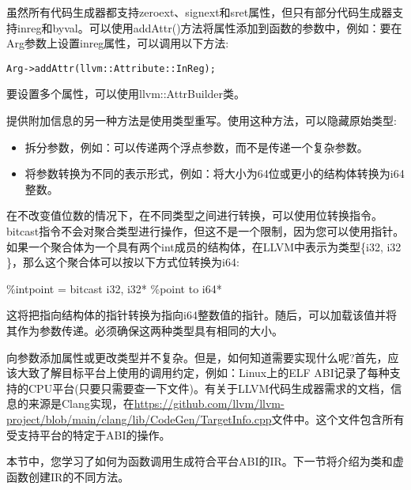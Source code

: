 虽然所有代码生成器都支持zeroext、signext和sret属性，但只有部分代码生成器支持inreg和byval。可以使用addAttr()方法将属性添加到函数的参数中，例如：要在Arg参数上设置inreg属性，可以调用以下方法:\par

\begin{lstlisting}[caption={}]
Arg->addAttr(llvm::Attribute::InReg);
\end{lstlisting}

要设置多个属性，可以使用llvm::AttrBuilder类。\par

提供附加信息的另一种方法是使用类型重写。使用这种方法，可以隐藏原始类型:\par

\begin{itemize}
\item 拆分参数，例如：可以传递两个浮点参数，而不是传递一个复杂参数。
\item 将参数转换为不同的表示形式，例如：将大小为64位或更小的结构体转换为i64整数。
\end{itemize}

在不改变值位数的情况下，在不同类型之间进行转换，可以使用位转换指令。bitcast指令不会对聚合类型进行操作，但这不是一个限制，因为您可以使用指针。如果一个聚合体为一个具有两个int成员的结构体，在LLVM中表示为类型\{i32, i32 \}，那么这个聚合体可以按以下方式位转换为i64:\par

\begin{tcolorbox}[colback=white,colframe=black]
\%intpoint = bitcast { i32, i32}* \%point to i64*
\end{tcolorbox}

这将把指向结构体的指针转换为指向i64整数值的指针。随后，可以加载该值并将其作为参数传递。必须确保这两种类型具有相同的大小。\par

向参数添加属性或更改类型并不复杂。但是，如何知道需要实现什么呢?首先，应该大致了解目标平台上使用的调用约定，例如：Linux上的ELF ABI记录了每种支持的CPU平台(只要只需要查一下文件)。有关于LLVM代码生成器需求的文档，信息的来源是Clang实现，在\url{https://github.com/llvm/llvm-project/blob/main/clang/lib/CodeGen/TargetInfo.cpp}文件中。这个文件包含所有受支持平台的特定于ABI的操作。\par

本节中，您学习了如何为函数调用生成符合平台ABI的IR。下一节将介绍为类和虚函数创建IR的不同方法。\par























